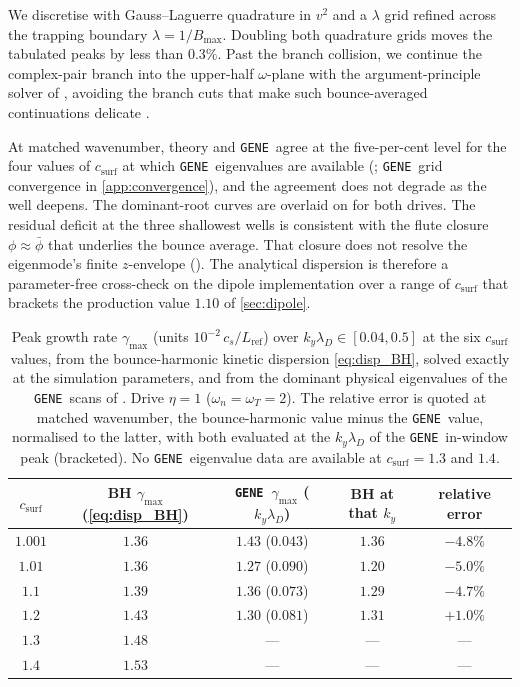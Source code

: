 \documentclass{jpp}
\newcommand{\lambdaD}{\lambda_D}
\newcommand{\gene}{\texttt{GENE}}
\begin{document}
We discretise with Gauss--Laguerre quadrature in $v^2$ and a $\lambda$ grid refined across the trapping boundary $\lambda = 1/B_\mathrm{max}$. Doubling both quadrature grids moves the tabulated peaks by less than $0.3\%$. Past the branch collision, we continue the complex-pair branch into the upper-half $\omega$-plane with the argument-principle solver of \citet{IvanovAdkins2023}, avoiding the branch cuts that make such bounce-averaged continuations delicate \citep{Sugama1999, Helander2011}.

At matched wavenumber, theory and \gene\ agree at the five-per-cent level for the four values of $c_\mathrm{surf}$ at which \gene\ eigenvalues are available (; \gene\ grid convergence in \cref{app:convergence}), and the agreement does not degrade as the well deepens. The dominant-root curves are overlaid on  for both drives. The residual deficit at the three shallowest wells is consistent with the flute closure $\phi \approx \bar\phi$ that underlies the bounce average. That closure does not resolve the eigenmode's finite $z$-envelope (). The analytical dispersion is therefore a parameter-free cross-check on the dipole implementation over a range of $c_\mathrm{surf}$ that brackets the production value $1.10$ of \cref{sec:dipole}.


\begin{table}
\centering
\renewcommand{\arraystretch}{1.15}
\begin{tabular}{ccccc}
\hline
$c_\mathrm{surf}$ & BH $\gamma_\mathrm{max}$ (\ref{eq:disp_BH}) & \gene\ $\gamma_\mathrm{max}$ ($k_y\lambdaD$) & BH at that $k_y$ & relative error \\
\hline
$1.001$ & $1.36$ & $1.43$ ($0.043$) & $1.36$ & $-4.8\%$ \\
$1.01$  & $1.36$ & $1.27$ ($0.090$) & $1.20$ & $-5.0\%$ \\
$1.1$   & $1.39$ & $1.36$ ($0.073$) & $1.29$ & $-4.7\%$ \\
$1.2$   & $1.43$ & $1.30$ ($0.081$) & $1.31$ & $+1.0\%$ \\
$1.3$   & $1.48$ & ---              & ---    & ---      \\
$1.4$   & $1.53$ & ---              & ---    & ---      \\
\hline
\end{tabular}
\caption{Peak growth rate $\gamma_\mathrm{max}$ (units $10^{-2}\,c_s/L_\mathrm{ref}$) over $k_y\lambdaD \in [0.04, 0.5]$ at the six $c_\mathrm{surf}$ values, from the bounce-harmonic kinetic dispersion \cref{eq:disp_BH}, solved exactly at the simulation parameters, and from the dominant physical eigenvalues of the \gene\ scans of . Drive $\eta = 1$ ($\omega_n = \omega_T = 2$). The relative error is quoted at matched wavenumber, the bounce-harmonic value minus the \gene\ value, normalised to the latter, with both evaluated at the $k_y\lambdaD$ of the \gene\ in-window peak (bracketed). No \gene\ eigenvalue data are available at $c_\mathrm{surf} = 1.3$ and $1.4$.}
\label{tab:BH_results}
\end{table}
\end{document}
